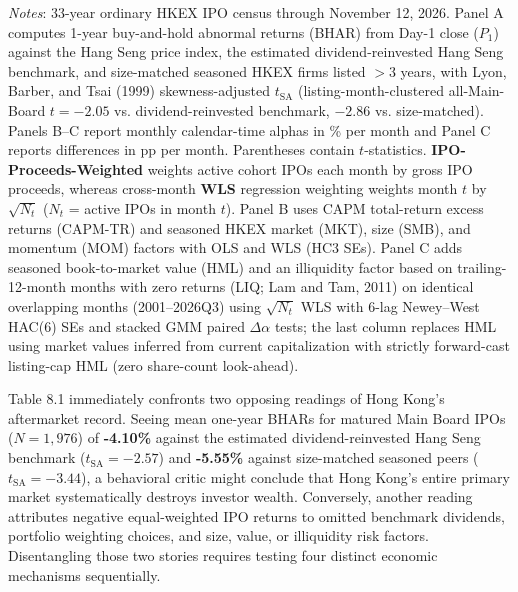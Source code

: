 \documentclass[11pt,letterpaper]{article}
\begin{document}
\begin{table}[p]
\par\vspace{3pt}\noindent\parbox{\textwidth}{\scriptsize\raggedright \textit{Notes}: 33-year ordinary HKEX IPO census through November 12, 2026. Panel A computes 1-year buy-and-hold abnormal returns (BHAR) from Day-1 close ($P_1$) against the Hang Seng price index, the estimated dividend-reinvested Hang Seng benchmark, and size-matched seasoned HKEX firms listed $>3$ years, with Lyon, Barber, and Tsai (1999) skewness-adjusted $t_{\text{SA}}$ (listing-month-clustered all-Main-Board $t = -2.05$ vs. dividend-reinvested benchmark, $-2.86$ vs. size-matched). Panels B–C report monthly calendar-time alphas in \% per month and Panel C reports differences in pp per month. Parentheses contain $t$-statistics. \textbf{IPO-Proceeds-Weighted} weights active cohort IPOs each month by gross IPO proceeds, whereas cross-month \textbf{WLS} regression weighting weights month $t$ by $\sqrt{N_t}$ ($N_t$ = active IPOs in month $t$). Panel B uses CAPM total-return excess returns (CAPM-TR) and seasoned HKEX market (MKT), size (SMB), and momentum (MOM) factors with OLS and WLS (HC3 SEs). Panel C adds seasoned book-to-market value (HML) and an illiquidity factor based on trailing-12-month months with zero returns (LIQ; Lam and Tam, 2011) on identical overlapping months (2001–2026Q3) using $\sqrt{N_t}$ WLS with 6-lag Newey–West HAC(6) SEs and stacked GMM paired $\Delta\alpha$ tests; the last column replaces HML using market values inferred from current capitalization with strictly forward-cast listing-cap HML (zero share-count look-ahead).}
\end{table}

Table 8.1 immediately confronts two opposing readings of Hong Kong's aftermarket record. Seeing mean one-year BHARs for matured Main Board IPOs ($N = 1,976$) of \textbf{-4.10\%} against the estimated dividend-reinvested Hang Seng benchmark ($t_{\text{SA}} = -2.57$) and \textbf{-5.55\%} against size-matched seasoned peers ($t_{\text{SA}} = -3.44$), a behavioral critic might conclude that Hong Kong's entire primary market systematically destroys investor wealth. Conversely, another reading attributes negative equal-weighted IPO returns to omitted benchmark dividends, portfolio weighting choices, and size, value, or illiquidity risk factors. Disentangling those two stories requires testing four distinct economic mechanisms sequentially.
\end{document}
